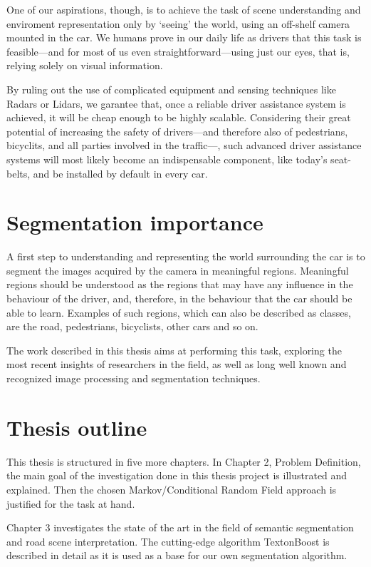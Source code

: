 One of our aspirations, though, is to achieve the task of scene understanding and enviroment representation only by `seeing' the world, using an off-shelf camera mounted in the car. We humans prove in our daily life as drivers that this task is feasible---and for most of us even straightforward---using just our eyes, that is, relying solely on visual information.

By ruling out the use of complicated equipment and sensing techniques like Radars or Lidars, we garantee that, once a reliable driver assistance system is achieved, it will be cheap enough to be highly scalable. Considering their great potential of increasing the safety of drivers---and therefore also of pedestrians, bicyclits, and all parties involved in the traffic---, such advanced driver assistance systems will most likely become an indispensable component, like today's seat-belts, and be installed by default in every car.

\section{Segmentation importance} \label{sect:segmentation}

A first step to understanding and representing the world surrounding the car is to segment the images acquired by the camera in meaningful regions. Meaningful regions should be understood as the regions that may have any influence in the behaviour of the driver, and, therefore, in the behaviour that the car should be able to learn. Examples of such regions, which can also be described as classes, are the road, pedestrians, bicyclists, other cars and so on. 

The work described in this thesis aims at performing this task, exploring the most recent insights of researchers in the field, as well as long well known and recognized image processing and segmentation techniques.

\section{Thesis outline} \label{sect:thesis_outline}

This thesis is structured in five more chapters. In Chapter 2, Problem Definition, the main goal of the investigation done in this thesis project is illustrated and explained. Then the chosen Markov/Conditional Random Field approach is justified for the task at hand.

Chapter 3 investigates the state of the art in the field of semantic segmentation and road scene interpretation. The cutting-edge algorithm TextonBoost is described in detail as it is used as a base for our own segmentation algorithm. 


